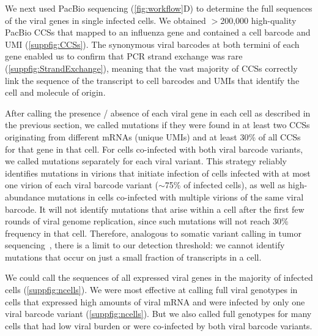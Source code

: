 \documentclass[lineno]{asm-article}
\newcommand{\FIG}[1]{\autoref{fig:#1}}
\newcommand{\SUPPFIG}[1]{\autoref{suppfig:#1}}
\begin{document}
We next used PacBio sequencing (\FIG{workflow}D) to determine the full sequences of the viral genes in single infected cells.
We obtained $>$200,000 high-quality PacBio CCSs that mapped to an influenza gene and contained a cell barcode and UMI (\SUPPFIG{CCSs}).
The synonymous viral barcodes at both termini of each gene enabled us to confirm that PCR strand exchange was rare (\SUPPFIG{StrandExchange}), meaning that the vast majority of CCSs correctly link the sequence of the transcript to cell barcodes and UMIs that identify the cell and molecule of origin.

After calling the presence / absence of each viral gene in each cell as described in the previous section, we called mutations if they were found in at least two CCSs originating from different mRNAs (unique UMIs) and at least 30\% of all CCSs for that gene in that cell.
For cells co-infected with both viral barcode variants, we called mutations separately for each viral variant.
This strategy reliably identifies mutations in virions that initiate infection of cells infected with at most one virion of each viral barcode variant ($\sim$75\% of infected cells), as well as high-abundance mutations in cells co-infected with multiple virions of the same viral barcode.
It will not identify mutations that arise within a cell after the first few rounds of viral genome replication, since such mutations will not reach 30\% frequency in that cell.
Therefore, analogous to somatic variant calling in tumor sequencing~\cite{xu2014comparison, cibulskis2013sensitive}, there is a limit to our detection threshold: we cannot identify mutations that occur on just a small fraction of transcripts in a cell. 

We could call the sequences of all expressed viral genes in the majority of infected cells (\SUPPFIG{ncells}).
We were most effective at calling full viral genotypes in cells that expressed high amounts of viral mRNA and were infected by only one viral barcode variant (\SUPPFIG{ncells}).
But we also called full genotypes for many cells that had low viral burden or were co-infected by both viral barcode variants.
\end{document}
